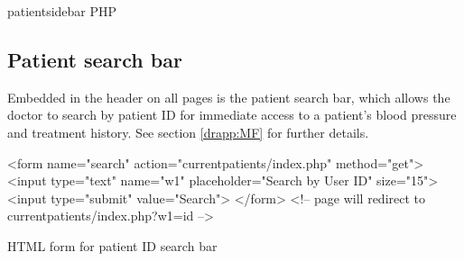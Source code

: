 \documentclass[11pt]{article}
\begin{document}
\begin{code}[ht]
\caption{patientsidebar PHP}
\label{code:PHPsidebar}
\end{code}


\subsection{Patient search bar}

Embedded in the header on all pages is the patient search bar, which allows the doctor to search by patient ID for immediate access to a patient's blood pressure and treatment history. See section \ref{drapp:MF} for further details. 



\begin{code}[ht]
\begin{html}
<form name="search" action="currentpatients/index.php" method="get">
<input type="text" name="w1" placeholder="Search by User ID" size="15">
<input type="submit" value="Search">
</form>
<!-- page will redirect to currentpatients/index.php?w1=id -->
\end{html}
\caption{HTML form for patient ID search bar}
\label{code:searchBar}
\end{code}
\end{document}

